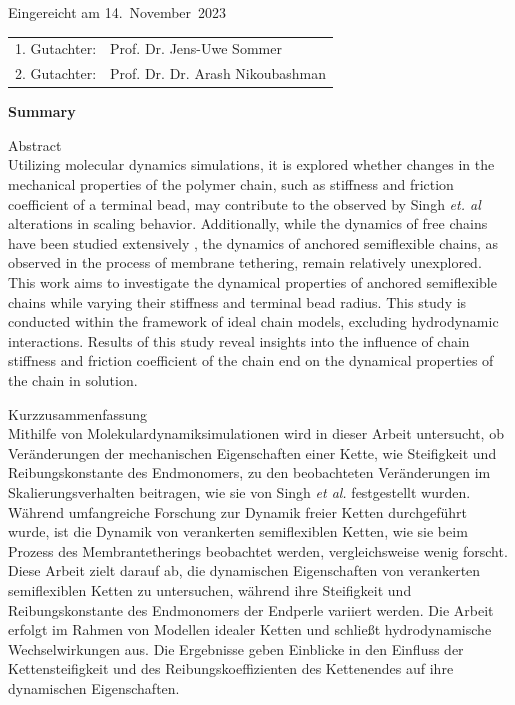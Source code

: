 \documentclass[
    paper=A4,pagesize=automedia,fontsize=12pt,
    BCOR=15mm,DIV=22,
    twoside,headinclude,footinclude=false,
    fleqn,             %
    bibliography=totocnumbered,          %
    listof=totoc,                %
    listof=flat,                 %
    cleardoublepage=empty      %
    numbers=endperiod
]{scrartcl}
\begin{document}
\thispagestyle{empty}\vspace*{48em}

Eingereicht am 14.~November~2023\vspace{1.5em}
\par{\large\begin{tabular}{ll}
        1. Gutachter: & Prof. Dr. Jens-Uwe Sommer \\
        2. Gutachter: & Prof. Dr. Dr. Arash Nikoubashman \\
    \end{tabular}}


\newpage
\begin{center}\large\bfseries Summary\end{center}


Abstract \\
Utilizing molecular dynamics simulations, it is explored whether changes 
in the mechanical properties of the polymer chain, such as 
stiffness and friction coefficient of a terminal bead, may contribute to the 
observed by Singh \emph{et. al} \cite{Singh:2022} alterations in scaling behavior. 
Additionally, while the dynamics of free chains have been studied extensively 
\cite{Nikoubashman2016} \cite{Singh:2022}, 
the dynamics of anchored semiflexible chains, as observed in the process of 
membrane tethering, remain relatively unexplored. This work aims to investigate 
the dynamical properties of anchored semiflexible chains while varying their 
stiffness and terminal bead radius. This study is conducted within the 
framework of ideal chain models, 
excluding hydrodynamic interactions. Results of this study reveal insights 
into the influence of chain stiffness and friction coefficient of the chain end
on the dynamical properties of the chain in solution.


\vspace{15em}
Kurzzusammenfassung \\
Mithilfe von Molekulardynamiksimulationen wird in dieser Arbeit untersucht, 
ob Veränderungen der mechanischen Eigenschaften einer Kette, 
wie Steifigkeit und Reibungskonstante des Endmonomers, 
zu den beobachteten Veränderungen im Skalierungsverhalten beitragen, 
wie sie von Singh \emph{et al.} \cite{Singh:2022} festgestellt wurden. 
Während umfangreiche Forschung zur Dynamik freier Ketten 
durchgeführt wurde, ist die Dynamik von verankerten semiflexiblen Ketten, 
wie sie beim Prozess des Membrantetherings beobachtet werden, 
vergleichsweise wenig forscht. Diese Arbeit zielt darauf ab, die dynamischen 
Eigenschaften von verankerten semiflexiblen Ketten zu untersuchen, 
während ihre Steifigkeit und Reibungskonstante des Endmonomers der Endperle 
variiert werden. Die Arbeit erfolgt im Rahmen von Modellen idealer Ketten und schließt 
hydrodynamische Wechselwirkungen aus. Die Ergebnisse geben Einblicke in den 
Einfluss der Kettensteifigkeit und des Reibungskoeffizienten des Kettenendes auf 
ihre dynamischen Eigenschaften.
\end{document}
